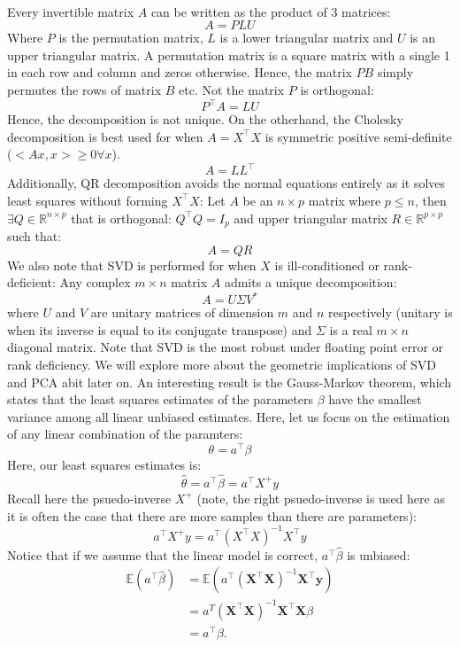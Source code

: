 \documentclass[12pt]{article}
\begin{document}
\\
Every invertible matrix $A$ can be written as the product of 3 matrices:
\[A = PLU\]
Where $P$ is the permutation matrix, $L$ is a lower triangular matrix and $U$ is an upper triangular matrix. A permutation matrix is a square matrix with a single 1 in each row and column and zeros otherwise. Hence, the matrix $PB$ simply permutes the rows of matrix $B$ etc. Not the matrix $P$ is orthogonal:
\[P^\top A = LU\]
Hence, the decomposition is not unique. On the otherhand, the Cholesky decomposition is best used for when $A = X^\top X$ is symmetric positive semi-definite ($<Ax,x> \geq 0 \forall x$).
\[A = LL^\top\]
Additionally, QR decomposition avoids the normal equations entirely as it solves least squares without forming $X^\top X$: Let $A$ be an $n
\times p $ matrix where $p \leq n$, then $\exists Q \in \mathbb{R}^{n \times p}$ that is orthogonal: $Q^\top Q = I_p$ and upper triangular matrix $R \in \mathbb{R}^{p\times p}$ such that:
\[A = QR\]
We also note that SVD is performed for when $X$ is ill-conditioned or rank-deficient: Any complex $m \times n$ matrix $A$ admits a unique decomposition:
\[A = U\Sigma V^*\]
where $U$ and $V$ are unitary matrices of dimension $m$ and $n$ respectively (unitary is when its inverse is equal to its conjugate transpose) and $\Sigma$ is a real $m \times n$ diagonal matrix. Note that SVD is the most robust under floating point error or rank deficiency. We will explore more about the geometric implications of SVD and PCA abit later on. An interesting result is the Gauss-Markov theorem, which states that the least squares estimates of the parameters $\beta$ have the smallest variance among all linear unbiased estimates. Here, let us focus on the estimation of any linear combination of the paramters:
\[\theta = a^\top \beta\]
Here, our least squares estimates is:
\[\hat{\theta} = a^\top \hat{\beta} = a^\top X^+ y\]
Recall here the psuedo-inverse $X^+$ (note, the right psuedo-inverse is used here as it is often the case that there are more samples than there are parameters):
\[a^\top X^+ y = a^\top (X^\top X)^{-1}X^\top y\]
Notice that if we assume that the linear model is correct, $a^\top \hat{\beta}$ is unbiased:
\begin{align*}
\mathbb{E}(a^\top \hat{\beta}) 
&= \mathbb{E}\left(a^\top (\mathbf{X}^\top \mathbf{X})^{-1} \mathbf{X}^\top \mathbf{y} \right) \\
&= a^T (\mathbf{X}^\top \mathbf{X})^{-1} \mathbf{X}^\top \mathbf{X} \beta \\
&= a^\top \beta.
\end{align*}
\end{document}

